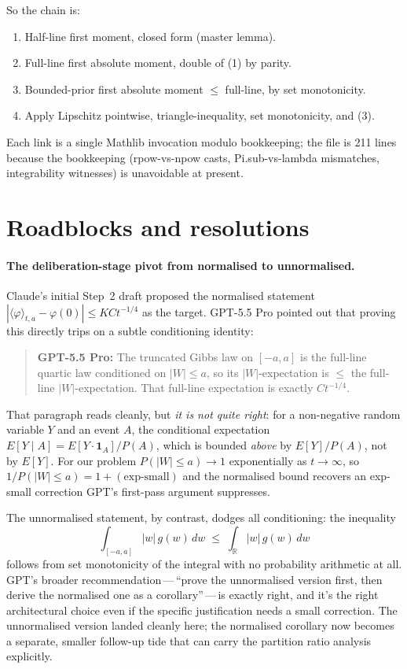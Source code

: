 \documentclass[11pt]{article}
\newcommand{\gptbox}[1]{\par\medskip\begin{quote}\small\textbf{\textcolor{green!50!black}{GPT-5.5 Pro:}} #1\end{quote}\medskip}
\begin{document}
So the chain is:

\begin{enumerate}\itemsep0pt
\item Half-line first moment, closed form (master lemma).
\item Full-line first absolute moment, double of (1) by parity.
\item Bounded-prior first absolute moment $\le$ full-line, by set monotonicity.
\item Apply Lipschitz pointwise, triangle-inequality, set monotonicity, and (3).
\end{enumerate}

Each link is a single Mathlib invocation modulo bookkeeping; the file is
211 lines because the bookkeeping (rpow-vs-npow casts, Pi.sub-vs-lambda
mismatches, integrability witnesses) is unavoidable at present.

\section{Roadblocks and resolutions}

\paragraph{The deliberation-stage pivot from normalised to unnormalised.}
Claude's initial Step~2 draft proposed the normalised statement
$|\langle\varphi\rangle_{t,a} - \varphi(0)| \le KC t^{-1/4}$ as the
target. GPT-5.5 Pro pointed out that proving this directly trips on a
subtle conditioning identity:

\gptbox{The truncated Gibbs law on $[-a,a]$ is the full-line quartic law
conditioned on $|W|\le a$, so its $|W|$-expectation is $\le$ the full-line
$|W|$-expectation. That full-line expectation is exactly $C t^{-1/4}$.}

That paragraph reads cleanly, but \emph{it is not quite right}: for a
non-negative random variable $Y$ and an event $A$, the conditional
expectation $E[Y \mid A] = E[Y \cdot \mathbf{1}_A]/P(A)$, which is bounded
\emph{above} by $E[Y]/P(A)$, not by $E[Y]$. For our problem
$P(|W| \le a) \to 1$ exponentially as $t \to \infty$, so
$1/P(|W| \le a) = 1 + (\text{exp-small})$ and the normalised bound
recovers an exp-small correction GPT's first-pass argument suppresses.

The unnormalised statement, by contrast, dodges all conditioning: the
inequality
\[
  \int_{[-a,a]} |w|\,g(w)\,dw \;\le\; \int_{\mathbb{R}} |w|\,g(w)\,dw
\]
follows from set monotonicity of the integral with no probability
arithmetic at all. GPT's broader recommendation\,---\,``prove the
unnormalised version first, then derive the normalised one as a
corollary''\,---\,is exactly right, and it's the right architectural choice
even if the specific justification needs a small correction. The
unnormalised version landed cleanly here; the normalised corollary now
becomes a separate, smaller follow-up tide that can carry the partition
ratio analysis explicitly.
\end{document}
